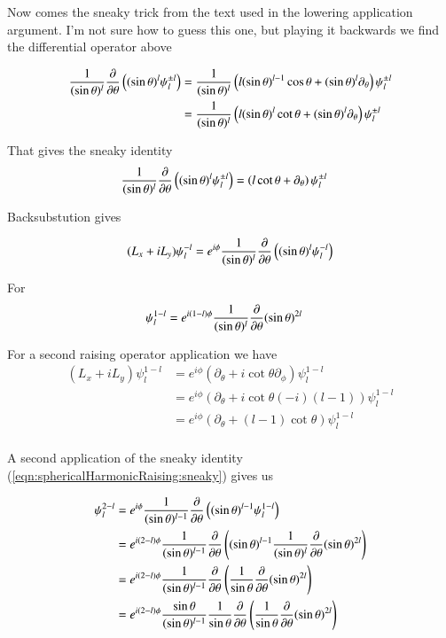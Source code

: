 Now comes the sneaky trick from the text used in the lowering application argument.  I'm not sure how to guess this one, but playing it backwards we find the differential operator above

\begin{align*}
\frac{1}{(\sin\theta)^l} \frac{\partial {}}{\partial {\theta}} \left( (\sin\theta)^l \psi_l^{\pm l} \right)
&=
\frac{1}{(\sin\theta)^l} \left( l (\sin\theta)^{l-1} \cos\theta + (\sin\theta)^l \partial_\theta \right) \psi_l^{\pm l} \\
&=
\frac{1}{(\sin\theta)^l} \left( l (\sin\theta)^{l} \cot\theta + (\sin\theta)^l \partial_\theta \right) \psi_l^{\pm l} \\
\end{align*}

That gives the sneaky identity
\begin{align}\label{eqn:sphericalHarmonicRaising:sneaky}
\frac{1}{(\sin\theta)^l} \frac{\partial {}}{\partial {\theta}} \left( (\sin\theta)^l \psi_l^{\pm l} \right)
&=
\left( l \cot\theta + \partial_\theta \right) \psi_l^{\pm l} 
\end{align}

Backsubstution gives

\begin{align*}
(L_x + iL_y) \psi_l^{-l} 
&=
e^{i\phi} \frac{1}{(\sin\theta)^l} \frac{\partial {}}{\partial {\theta}} \left( (\sin\theta)^l \psi_l^{-l} \right) \\
\end{align*}

For
\begin{align}\label{eqn:sphericalHarmonicRaising:minusLplus1}
\psi_l^{1-l}
&=
e^{i(1-l)\phi} \frac{1}{(\sin\theta)^l} \frac{\partial {}}{\partial {\theta}} (\sin\theta)^{2l}
\end{align}

For a second raising operator application we have
\begin{align*}
(L_x + iL_y) \psi_l^{1-l} 
&=
e^{i\phi} (\partial_\theta + i \cot\theta \partial_\phi) \psi_l^{1-l} \\
&=
e^{i\phi} (\partial_\theta + i \cot\theta (-i)(l-1)) \psi_l^{1-l} \\
&=
e^{i\phi} (\partial_\theta + (l-1)\cot\theta ) \psi_l^{1-l} \\
\end{align*}

A second application of the sneaky identity (\ref{eqn:sphericalHarmonicRaising:sneaky}) gives us

\begin{align*}
\psi_l^{2-l} 
&=
e^{i\phi} \frac{1}{(\sin\theta)^{l-1}} \frac{\partial {}}{\partial {\theta}} \left( (\sin\theta)^{l-1} \psi_l^{1-l} \right) \\
&=
e^{i(2-l)\phi} \frac{1}{(\sin\theta)^{l-1}} \frac{\partial {}}{\partial {\theta}} \left( (\sin\theta)^{l-1} 
\frac{1}{(\sin\theta)^l} \frac{\partial {}}{\partial {\theta}} (\sin\theta)^{2l}
\right) \\
&=
e^{i(2-l)\phi} \frac{1}{(\sin\theta)^{l-1}} \frac{\partial {}}{\partial {\theta}} \left( 
\frac{1}{\sin\theta} \frac{\partial {}}{\partial {\theta}} (\sin\theta)^{2l}
\right) \\
&=
e^{i(2-l)\phi} \frac{\sin\theta}{(\sin\theta)^{l-1}} \frac{1}{\sin\theta}\frac{\partial {}}{\partial {\theta}} \left( 
\frac{1}{\sin\theta} \frac{\partial {}}{\partial {\theta}} (\sin\theta)^{2l}
\right) \\
\end{align*}

